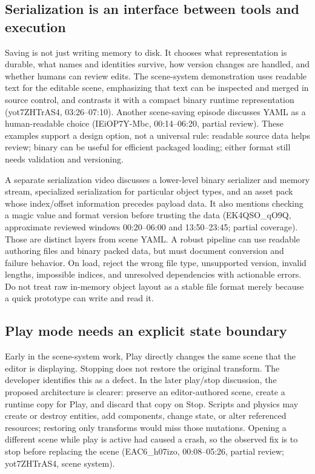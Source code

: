 \subsection{Serialization is an interface between tools and execution}\label{06-engine-ii-ch033-serialization-is-an-interface-between-tools-and-execution}

Saving is not just writing memory to disk. It chooses what representation is durable, what names and identities survive, how version changes are handled, and whether humans can review edits. The scene-system demonstration uses readable text for the editable scene, emphasizing that text can be inspected and merged in source control, and contrasts it with a compact binary runtime representation (yot7ZHTrAS4, 03:26--07:10). Another scene-saving episode discusses YAML as a human-readable choice (IEiOP7Y-Mbc, 00:14--06:20, partial review). These examples support a design option, not a universal rule: readable source data helps review; binary can be useful for efficient packaged loading; either format still needs validation and versioning.

A separate serialization video discusses a lower-level binary serializer and memory stream, specialized serialization for particular object types, and an asset pack whose index/offset information precedes payload data. It also mentions checking a magic value and format version before trusting the data (EK4QSO\_qO9Q, approximate reviewed windows 00:20--06:00 and 13:50--23:45; partial coverage). Those are distinct layers from scene YAML. A robust pipeline can use readable authoring files and binary packed data, but must document conversion and failure behavior. On load, reject the wrong file type, unsupported version, invalid lengths, impossible indices, and unresolved dependencies with actionable errors. Do not treat raw in-memory object layout as a stable file format merely because a quick prototype can write and read it.

\subsection{Play mode needs an explicit state boundary}\label{06-engine-ii-ch033-play-mode-needs-an-explicit-state-boundary}

Early in the scene-system work, Play directly changes the same scene that the editor is displaying. Stopping does not restore the original transform. The developer identifies this as a defect. In the later play/stop discussion, the proposed architecture is clearer: preserve an editor-authored scene, create a runtime copy for Play, and discard that copy on Stop. Scripts and physics may create or destroy entities, add components, change state, or alter referenced resources; restoring only transforms would miss those mutations. Opening a different scene while play is active had caused a crash, so the observed fix is to stop before replacing the scene (EAC6\_h07izo, 00:08--05:26, partial review; yot7ZHTrAS4, scene system).

